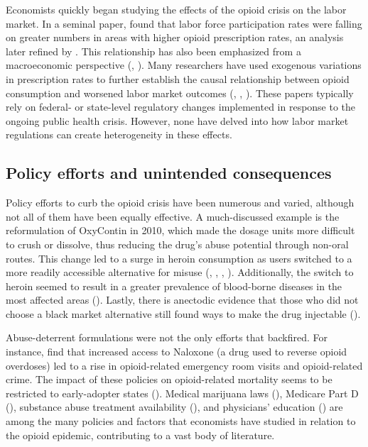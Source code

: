 \documentclass[12pt,a4paper]{article}
\begin{document}
Economists quickly began studying the effects of the opioid crisis on the labor market.
In a seminal paper, \textcite{Krueger2017} found that labor force participation rates were falling on greater numbers in areas with higher opioid prescription rates, an analysis later refined by \textcite{Aliprantis2023}.
This relationship has also been emphasized from a macroeconomic perspective (\cite{Greenwood2022a}, \cite{Greenwood2022b}).
Many researchers have used exogenous variations in prescription rates to further establish the causal relationship between opioid consumption and worsened labor market outcomes (\cite{Beheshti2023}, \cite{Powell2022}, \cite{Harris2020}).
These papers typically rely on federal- or state-level regulatory changes implemented in response to the ongoing public health crisis.
However, none have delved into how labor market regulations can create heterogeneity in these effects.

\subsection*{Policy efforts and unintended consequences}

Policy efforts to curb the opioid crisis have been numerous and varied, although not all of them have been equally effective.
A much-discussed example is the reformulation of OxyContin in 2010, which made the dosage units more difficult to crush or dissolve, thus reducing the drug's abuse potential through non-oral routes.
This change led to a surge in heroin consumption as users switched to a more readily accessible alternative for misuse (\cite{Alpert2018}, \cite{Evans2019}, \cite{Cicero2012}, \cite{Butler2013}).
Additionally, the switch to heroin seemed to result in a greater prevalence of blood-borne diseases in the most affected areas (\cite{Beheshti2019}).
Lastly, there is anectodic evidence that those who did not choose a black market alternative still found ways to make the drug injectable (\cite{Cicero2015}).

Abuse-deterrent formulations were not the only efforts that backfired. 
For instance, \textcite{Doleac2022} find that increased access to Naloxone (a drug used to reverse opioid overdoses) led to a rise in opioid-related emergency room visits and opioid-related crime. 
The impact of these policies on opioid-related mortality seems to be restricted to early-adopter states (\cite{Rees2019}).
Medical marijuana laws (\cite{Powell2018}), Medicare Part D (\cite{Powell2020}), substance abuse treatment availability (\cite{Swensen2015}), and physicians' education (\cite{Schnell2018}) are among the many policies and factors that economists have studied in relation to the opioid epidemic, contributing to a vast body of literature. 
\end{document}
